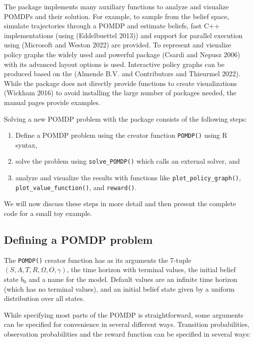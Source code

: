 The package implements many auxiliary functions to analyze and visualize POMDPs and their solution.
For example, to sample from the belief space, simulate trajectories through a
POMDP and estimate beliefs, fast C++ implementations (using  (Eddelbuettel 2013)) and
support for parallel execution using  (Microsoft and Weston 2022) are provided.
To represent and visualize policy graphs the widely used and powerful  package (Csardi and Nepusz 2006)
with its advanced layout options is used. Interactive policy graphs can be produced based on the
 (Almende B.V. and Contributors and Thieurmel 2022).
While the package does not directly provide functions to create  visualizations (Wickham 2016) to
avoid installing the large number of packages needed, the manual pages provide examples.

Solving a new POMDP problem with the  package consists of the following steps:

\begin{enumerate}
\def\labelenumi{\arabic{enumi}.}
\tightlist
\item
  Define a POMDP problem using the creator function \texttt{POMDP()} using R syntax,
\item
  solve the problem using \texttt{solve\_POMDP()} which calls an external solver, and
\item
  analyze and visualize the results with functions like \texttt{plot\_policy\_graph()}, \texttt{plot\_value\_function()}, and \texttt{reward()}.
\end{enumerate}

We will now discuss these steps in more detail and then present the complete code for a small toy example.

\hypertarget{defining-a-pomdp-problem}{%
\subsection{Defining a POMDP problem}\label{defining-a-pomdp-problem}}

The \texttt{POMDP()} creator function has as its arguments the
7-tuple \((S, A, T, R, \Omega , O, \gamma)\),
the time horizon with terminal values, the
initial belief state \(b_0\) and a name for the model. Default values are an infinite time
horizon (which has no terminal values), and an initial belief state given by a uniform distribution over all states.

While specifying most parts of the POMDP is straightforward, some arguments can be specified for convenience in
several different ways. Transition probabilities,
observation probabilities
and the reward function
can be
specified in several ways:

